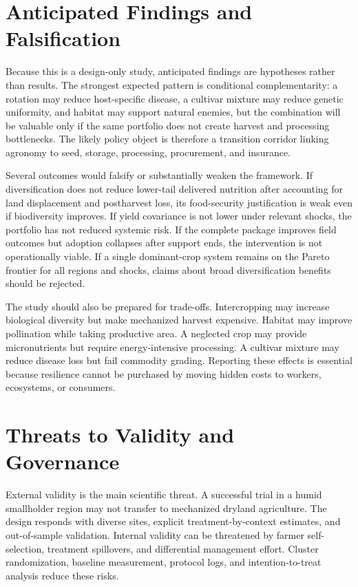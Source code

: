 \documentclass[conference]{IEEEtran}
\begin{document}
\section{Anticipated Findings and Falsification}
\label{sec:anticipated}
Because this is a design-only study, anticipated findings are hypotheses rather than results. The strongest expected pattern is conditional complementarity: a rotation may reduce host-specific disease, a cultivar mixture may reduce genetic uniformity, and habitat may support natural enemies, but the combination will be valuable only if the same portfolio does not create harvest and processing bottlenecks. The likely policy object is therefore a transition corridor linking agronomy to seed, storage, processing, procurement, and insurance.

Several outcomes would falsify or substantially weaken the framework. If diversification does not reduce lower-tail delivered nutrition after accounting for land displacement and postharvest loss, its food-security justification is weak even if biodiversity improves. If yield covariance is not lower under relevant shocks, the portfolio has not reduced systemic risk. If the complete package improves field outcomes but adoption collapses after support ends, the intervention is not operationally viable. If a single dominant-crop system remains on the Pareto frontier for all regions and shocks, claims about broad diversification benefits should be rejected.

The study should also be prepared for trade-offs. Intercropping may increase biological diversity but make mechanized harvest expensive. Habitat may improve pollination while taking productive area. A neglected crop may provide micronutrients but require energy-intensive processing. A cultivar mixture may reduce disease loss but fail commodity grading. Reporting these effects is essential because resilience cannot be purchased by moving hidden costs to workers, ecosystems, or consumers.

\section{Threats to Validity and Governance}
\label{sec:threats}
External validity is the main scientific threat. A successful trial in a humid smallholder region may not transfer to mechanized dryland agriculture. The design responds with diverse sites, explicit treatment-by-context estimates, and out-of-sample validation. Internal validity can be threatened by farmer self-selection, treatment spillovers, and differential management effort. Cluster randomization, baseline measurement, protocol logs, and intention-to-treat analysis reduce these risks.
\end{document}
